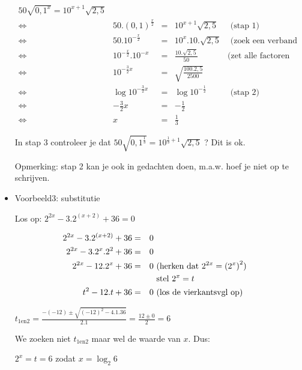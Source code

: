 \begin{itemize}
\[
{\displaystyle \begin{split}{\displaystyle 50\sqrt{0,1^{x}}=10^{x+1}\sqrt{2,5}}\\
	\Longleftrightarrow & 50.\left(0,1\right)^{\frac{x}{2}} & = & 10^{x+1}\sqrt{2,5} & \text{ (stap 1)}\\
	\Longleftrightarrow & 50.10^{-\frac{x}{2}} & = & 10^{x}.10.\sqrt{2,5} & \text{ (zoek een verband tss 0,1 en 10)}\\
	\Longleftrightarrow & 10^{-\frac{x}{2}}.10^{-x} & = & \frac{10.\sqrt{2,5}}{50} & \textrm{(zet alle factoren met x bij elkaar)}\\
	\Longleftrightarrow & 10^{-\frac{3}{2}x} & = & \sqrt{\frac{100.2,5}{2500}}\\
	\Longleftrightarrow & \log10^{-\frac{3}{2}x} & = & \log10^{-\frac{1}{2}} & \text{ (stap 2)}\\
	\Longleftrightarrow & -\frac{3}{2}x & = & -\frac{1}{2} & \text{}\\
	\Longleftrightarrow & x & = & \frac{1}{3}
	\end{split}
}
\]


In stap 3 controleer je dat ${\displaystyle 50\sqrt{0,1^{\frac{1}{3}}}=10^{\frac{1}{3}+1}\sqrt{2,5}}$
? Dit is ok.

Opmerking: stap 2 kan je ook in gedachten doen, m.a.w. hoef je niet
op te schrijven.


\item{Voorbeeld3: substitutie}

Los op: ${\displaystyle 2^{2x}-3.2^{(x+2)}+36=0}$

\[
{\displaystyle \begin{split}{\displaystyle 2^{2x}-3.2^{(x+2)}+36} & = & 0\\
	{\displaystyle 2^{2x}-3.2^{x}.2^{2}+36} & = & 0\\
	{\displaystyle 2^{2x}-12.2^{x}+36} & = & 0 & \text{ (herken dat \ensuremath{{\displaystyle 2^{2x}=\left(2^{x}\right)^{2}}})}\\
	&  &  & \text{ stel }2^{x}=t\\
	{\displaystyle t^{2}-12.t+36} & = & 0 & \text{ (los de vierkantsvgl op)}
	\end{split}
}
\]


${\displaystyle t_{1\textrm{en}2}=\frac{-(-12)\pm\sqrt{(-12)^{2}-4.1.36}}{2.1}=\frac{12\pm0}{2}=6}$

We zoeken niet ${\displaystyle t_{1\textrm{en}2}}$ maar wel de waarde
van $x$. Dus:

${\displaystyle 2^{x}=t=6}$ zodat ${\displaystyle x=\log_{2}6}$


\end{itemize}

